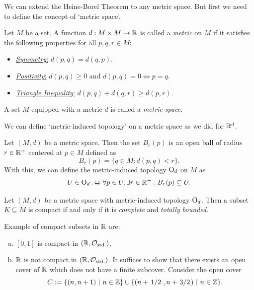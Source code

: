 We can extend the Heine-Borel Theorem to any metric space. But first we need to define the concept of `metric space'.

\begin{definition}
	Let \(M\) be a set. A function \(d: M \times M \to \mathbb R\) is called a \emph{metric} on \(M\) if it satisfies the following properties for all \(p, q, r \in M\):
	\begin{itemize}
		\item \uline{\emph{Symmetry}:} \(d(p, q) = d(q, p)\).
		\item \uline{\emph{Positivity}:} \(d(p, q) \geq 0\) and \(d(p, q) = 0 \iff p = q\).
		\item \uline{\emph{Triangle Inequality}:} \(d(p, q) + d(q, r) \geq d(p, r)\).
	\end{itemize}
	A set \(M\) equipped with a metric \(d\) is called a \emph{metric space}.
\end{definition}

We can define `metric-induced topology' on a metric space as we did for \(\mathbb R^d\).

\begin{remark}
	Let \((M, d)\) be a metric space. Then the set \(B_r(p)\) is an open ball of radius \(r \in \mathbb R^+\) centered at \(p \in M\) defined as
	\begin{equation}
		B_r(p) = \{q \in M: d(p, q) < r\}. \label{eq:open_ball}
	\end{equation}
	With this, we can define the metric-induced topology \(\mathrm{O}_d\) on \(M\) as
	\begin{equation}
		U \in \mathrm{O}_d :\Leftrightarrow \forall p \in U, \exists r \in \mathbb R^+: B_r(p) \subseteq U. \label{eq:metric_induced_topology}
	\end{equation}
\end{remark}

\begin{theorem}\label{thm:generalized_heine_borel}
	Let \((M, d)\) be a metric space with metric-induced topology \(\mathrm{O}_d\). Then a subset \(K \subseteq M\) is compact if and only if it is \emph{complete} and \emph{totally bounded}.
\end{theorem}

\begin{example}
	Example of compact subsets in \(\mathbb R\) are:
	\begin{enumerate}[(a)]
		\item \([0, 1]\) is compact in \((\mathbb R, \mathcal{O}_{\text{std.}})\).

		\item \(\mathbb R\) is not compact in \((\mathbb R, \mathcal{O}_{\text{std.}})\). It suffices to show that there exists an open cover of \(\mathbb R\) which does not have a finite subcover. Consider the open cover
		      \begin{equation}
			      C := \qty{(n, n + 1) \mid n \in \Z} \cup \qty{(n + \fhalf, n + \flatfrac{3}{2}) \mid n \in \Z}.
		      \end{equation}
	\end{enumerate}
\end{example}

